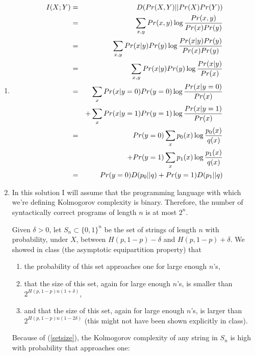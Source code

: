 \documentclass[11pt]{article} \usepackage{amssymb}
\begin{document}
\begin{enumerate}
\item
  \begin{eqnarray*}
    I(X;Y)&=&D(Pr(X,Y)||Pr(X)Pr(Y))
    \\ &=& \sum_{x,y}Pr(x,y)\log{Pr(x,y)\over Pr(x)Pr(y)}
    \\ &=& \sum_{x,y}Pr(x|y)Pr(y)\log{Pr(x|y)Pr(y)\over Pr(x)Pr(y)}
    \\ &=& \sum_{x,y}Pr(x|y)Pr(y)\log{Pr(x|y)\over Pr(x)}
    \\ &=& \sum_xPr(x|y=0)Pr(y=0)\log{Pr(x|y=0)\over Pr(x)}
    \\ &&+\sum_xPr(x|y=1)Pr(y=1)\log{Pr(x|y=1)\over Pr(x)}
    \\ &=& Pr(y=0)\sum_xp_0(x)\log{p_0(x)\over q(x)}
    \\ &&+Pr(y=1)\sum_xp_1(x)\log{p_1(x)\over q(x)}
    \\ &=&Pr(y=0)D(p_0||q)+Pr(y=1)D(p_1||q)
  \end{eqnarray*}
\item
  In this solution I will assume that the programming language with which 
  we're defining Kolmogorov complexity is binary. Therefore, the number 
  of syntactically correct programs of length $n$ is at most $2^n$.

  Given $\delta>0$, let $S_n\subset \{0,1\}^n$ be the set of strings of 
  length $n$ with probability, under $X$, between $H(p,1-p)-\delta$
  and $H(p,1-p)+\delta$. We showed in class 
  (the asymptotic equipartition property) that 
  \begin{enumerate}
  \item 
    \label{setprob}
    the probability of
    this set approaches one for large enough $n$'s, 
  \item
    \label{setsmall}
    that the 
    size of this set, again for large enough $n$'s, is smaller than
    $2^{H(p,1-p)n(1+\delta)}$, 
  \item
    \label{setsize}
    and that the 
    size of this set, again for large enough $n$'s, is larger than
    $2^{H(p,1-p)n(1-2\delta)}$ (this might not have been shown explicitly in class). 
  \end{enumerate}

  Because of (\ref{setsize}), the Kolmogorov complexity of any string
  in $S_n$ is high with probability that approaches one:


\end{enumerate}
\end{document}
